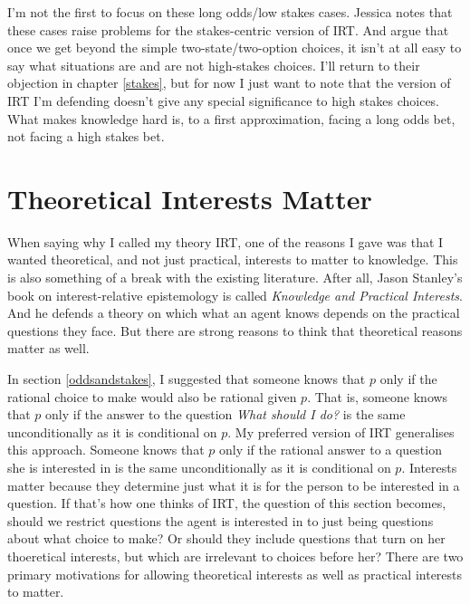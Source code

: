 \documentclass[11pt,]{book}
\begin{document}
I'm not the first to focus on these long odds/low stakes cases. Jessica \citet[176]{Brown2008} notes that these cases raise problems for the stakes-centric version of IRT. And \citet{AndersonHawthorne2019a} argue that once we get beyond the simple two-state/two-option choices, it isn't at all easy to say what situations are and are not high-stakes choices. I'll return to their objection in chapter \ref{stakes}, but for now I just want to note that the version of IRT I'm defending doesn't give any special significance to high stakes choices. What makes knowledge hard is, to a first approximation, facing a long odds bet, not facing a high stakes bet.

\hypertarget{whatinterests}{%
\section{Theoretical Interests Matter}\label{whatinterests}}

When saying why I called my theory IRT, one of the reasons I gave was that I wanted theoretical, and not just practical, interests to matter to knowledge. This is also something of a break with the existing literature. After all, Jason Stanley's book on interest-relative epistemology is called \emph{Knowledge and Practical Interests}. And he defends a theory on which what an agent knows depends on the practical questions they face. But there are strong reasons to think that theoretical reasons matter as well.

In section \ref{oddsandstakes}, I suggested that someone knows that \(p\) only if the rational choice to make would also be rational given \(p\). That is, someone knows that \(p\) only if the answer to the question \emph{What should I do?} is the same unconditionally as it is conditional on \(p\). My preferred version of IRT generalises this approach. Someone knows that \(p\) only if the rational answer to a question she is interested in is the same unconditionally as it is conditional on \(p\). Interests matter because they determine just what it is for the person to be interested in a question. If that's how one thinks of IRT, the question of this section becomes, should we restrict questions the agent is interested in to just being questions about what choice to make? Or should they include questions that turn on her thoeretical interests, but which are irrelevant to choices before her? There are two primary motivations for allowing theoretical interests as well as practical interests to matter.
\end{document}
